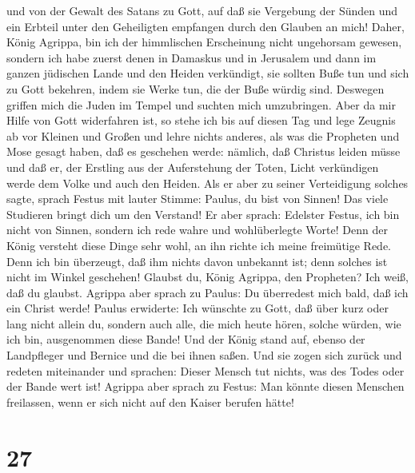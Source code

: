 und von der Gewalt des Satans zu Gott, auf daß sie Vergebung der Sünden
und ein Erbteil unter den Geheiligten empfangen durch den Glauben an
mich!  Daher, König Agrippa, bin ich der himmlischen
Erscheinung nicht ungehorsam gewesen,  sondern ich habe
zuerst denen in Damaskus und in Jerusalem und dann im ganzen jüdischen
Lande und den Heiden verkündigt, sie sollten Buße tun und sich zu Gott
bekehren, indem sie Werke tun, die der Buße würdig sind. 
Deswegen griffen mich die Juden im Tempel und suchten mich umzubringen.
 Aber da mir Hilfe von Gott widerfahren ist, so stehe ich
bis auf diesen Tag und lege Zeugnis ab vor Kleinen und Großen und lehre
nichts anderes, als was die Propheten und Mose gesagt haben, daß es
geschehen werde:  nämlich, daß Christus leiden müsse und
daß er, der Erstling aus der Auferstehung der Toten, Licht verkündigen
werde dem Volke und auch den Heiden.  Als er aber zu
seiner Verteidigung solches sagte, sprach Festus mit lauter Stimme:
Paulus, du bist von Sinnen! Das viele Studieren bringt dich um den
Verstand!  Er aber sprach: Edelster Festus, ich bin nicht
von Sinnen, sondern ich rede wahre und wohlüberlegte Worte!
 Denn der König versteht diese Dinge sehr wohl, an ihn
richte ich meine freimütige Rede. Denn ich bin überzeugt, daß ihm nichts
davon unbekannt ist; denn solches ist nicht im Winkel geschehen!
 Glaubst du, König Agrippa, den Propheten? Ich weiß, daß
du glaubst.  Agrippa aber sprach zu Paulus: Du überredest
mich bald, daß ich ein Christ werde!  Paulus erwiderte:
Ich wünschte zu Gott, daß über kurz oder lang nicht allein du, sondern
auch alle, die mich heute hören, solche würden, wie ich bin, ausgenommen
diese Bande!  Und der König stand auf, ebenso der
Landpfleger und Bernice und die bei ihnen saßen.  Und sie
zogen sich zurück und redeten miteinander und sprachen: Dieser Mensch
tut nichts, was des Todes oder der Bande wert ist! 
Agrippa aber sprach zu Festus: Man könnte diesen Menschen freilassen,
wenn er sich nicht auf den Kaiser berufen hätte!

\hypertarget{section-26}{%
\section{27}\label{section-26}}


